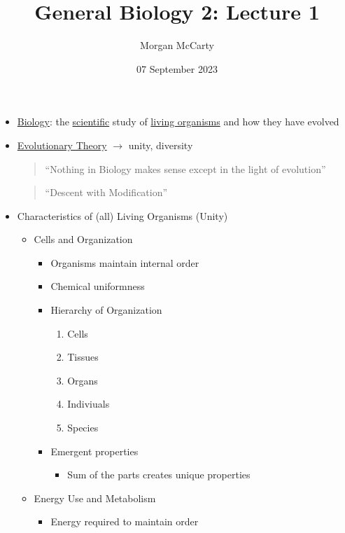 \documentclass[12pt]{article}
\title{
    General Biology 2: Lecture 1}
\author{Morgan McCarty}
\date{07 September 2023}
\begin{document}
    \maketitle

    \begin{itemize}
        \item \underline{Biology}: the \underline{scientific} study of \underline{living organisms} and how they have evolved
        \item \underline{Evolutionary Theory} $\rightarrow$ unity, diversity
        \begin{quote}
            ``Nothing in Biology makes sense except in the light of evolution''
        \end{quote}
        \begin{quote}
            ``Descent with Modification''
        \end{quote}
        \item Characteristics of (all) Living Organisms (Unity)
        \begin{itemize}
            \item Cells and Organization
            \begin{itemize}
                \item Organisms maintain internal order
                \item Chemical uniformness
                \item Hierarchy of Organization
                \begin{enumerate}
                    \item Cells
                    \item Tissues
                    \item Organs
                    \item Indiviuals
                    \item Species
                \end{enumerate}
                \item Emergent properties
                \begin{itemize}
                    \item Sum of the parts creates unique properties
                \end{itemize}
            \end{itemize}
            \item Energy Use and Metabolism
            \begin{itemize}
                \item Energy required to maintain order

\end{itemize}
\end{itemize}
\end{itemize}
\end{document}

